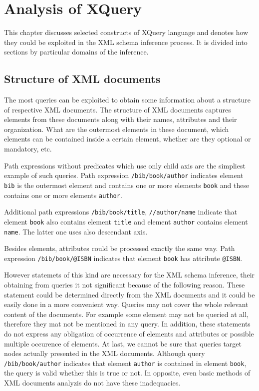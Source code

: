 \chapter{Analysis of XQuery}
This chapter discusses selected constructs of XQuery language and denotes how they could be exploited in the XML schema inference process. It is divided into sections by particular domains of the inference.

\section{Structure of XML documents}
The most queries can be exploited to obtain some information about a structure of respective XML documents. The structure of XML documents captures elements from these documents along with their names, attributes and their organization. What are the outermost elements in these document, which elements can be contained inside a certain element, whether are they optional or mandatory, etc.

Path expressions without predicates which use only child axis are the simpliest example of such queries. Path expression \texttt{/bib/book/author} indicates element \texttt{bib} is the outermost element and contains one or more elements \texttt{book} and these contains one or more elements \texttt{author}.

Additional path expressions \texttt{/bib/book/title}, \texttt{//author/name} indicate that element \texttt{book} also contains element \texttt{title} and element \texttt{author} contains element \texttt{name}. The latter one uses also descendant axis.

Besides elements, attributes could be processed exactly the same way. Path expression \texttt{/bib/book/@ISBN} indicates that element \texttt{book} has attribute \texttt{@ISBN}.

However statemets of this kind are necessary for the XML schema inference, their obtaining from queries it not significant because of the following reason. These statement could be determined directly from the XML documents and it could be easily done in a more convenient way. Queries may not cover the whole relevant content of the documents. For example some element may not be queried at all, therefore they mat not be mentioned in any query. In addition, these statements do not express any obligation of occurrence of elements and attributes or possible multiple occurence of elements. At last, we cannot be sure that queries target nodes actually presented in the XML documents. Although query \texttt{/bib/book/author} indicates that element \texttt{author} is contained in element \texttt{book}, the query is valid whether this is true or not. In opposite, even basic methods of XML documents analyzis do not have these inadequacies.

